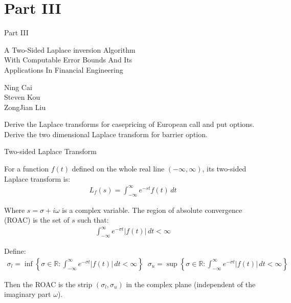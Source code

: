 \documentclass{beamer}
\begin{document}
 \section{Part III}
\begin{frame}{Part III}

    \begin{center}
        A Two-Sided Laplace inversion Algorithm \\
       With Computable Error Bounds And Its \\
       Applications In Financial Engineering
    \end{center}
    \vspace{2em}
    \begin{center}
        Ning Cai\\
        Steven Kou\\
        ZongJian Liu
    \end{center}
    \vspace{3em}
    \par  Derive the Laplace transforms for 
    casepricing of European call and put options. Derive the two dimensional Laplace transform for barrier option.

\end{frame}

\begin{frame}{Two-sided Laplace Transform}


    {\footnotesize \footnotesize
    \par For a function \( f(t) \) defined on the whole real line \((-\infty, \infty)\), its two-sided Laplace transform is:
    \begin{align*}
        L_f(s) = \int_{-\infty}^{\infty} e^{-st}f(t)\,dt
    \end{align*}
    \par Where \( s = \sigma + i\omega \) is a complex variable. The region of absolute convergence (ROAC) is the set of $s$ such that:
    \begin{align*}
        \int_{-\infty}^{\infty} e^{-\sigma t}|f(t)|\,dt < \infty
    \end{align*}
    \par Define: 
    \begin{align*}
         \sigma_l = \inf \left\{ \sigma \in \mathbb{R} : \int_{-\infty}^{\infty} e^{-\sigma t}|f(t)|\,dt < \infty \right\}\;\;
          \sigma_u = \sup \left\{ \sigma \in \mathbb{R} : \int_{-\infty}^{\infty} e^{-\sigma t}|f(t)|\,dt < \infty \right\}
    \end{align*}
    \par Then the ROAC is the strip \((\sigma_l, \sigma_u)\) in the complex plane (independent of the imaginary part \(\omega\)).
    }
    
\end{frame}
\end{document}
